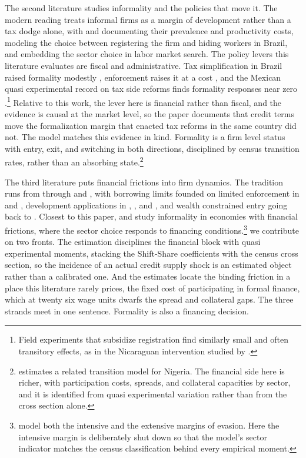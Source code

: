 \documentclass[12pt]{article}
\begin{document}
The second literature studies informality and the policies that move it. The modern reading treats informal firms as a margin of development rather than a tax dodge alone, with \citet{la2014informality} and \citet{busso2012formal} documenting their prevalence and productivity costs, \citet{ulyssea2018firms} modeling the choice between registering the firm and hiding workers in Brazil, and \citet{meghir2015wages} embedding the sector choice in labor market search. The policy levers this literature evaluates are fiscal and administrative. Tax simplification in Brazil raised formality modestly \citep{rocha2018lower}, enforcement raises it at a cost \citep{almeida2012enforcement}, and the Mexican quasi experimental record on tax side reforms finds formality responses near zero \citep{campos2020effects,bobba2021labor}.\footnote{Field experiments that subsidize registration find similarly small and often transitory effects, as in the Nicaraguan intervention studied by \citet{sutter2017transitioning}.} Relative to this work, the lever here is financial rather than fiscal, and the evidence is causal at the market level, so the paper documents that credit terms move the formalization margin that enacted tax reforms in the same country did not. The model matches this evidence in kind. Formality is a firm level status with entry, exit, and switching in both directions, disciplined by census transition rates, rather than an absorbing state.\footnote{\citet{adom2025structural} estimates a related transition model for Nigeria. The financial side here is richer, with participation costs, spreads, and collateral capacities by sector, and it is identified from quasi experimental variation rather than from the cross section alone.}

The third literature puts financial frictions into firm dynamics. The tradition runs from \citet{hopenhayn1992entry} through \citet{cooley2001financial} and \citet{gomes2001financing}, with borrowing limits founded on limited enforcement in \citet{albuquerque2004optimal} and \citet{clementi2006theory}, development applications in \citet{arellano2012firm}, \citet{midrigan2014finance}, and \citet{moll2014productivity}, and wealth constrained entry going back to \citet{evans1989estimated}. Closest to this paper, \citet{d2012financial} and \citet{erosa2023public} study informality in economies with financial frictions, where the sector choice responds to financing conditions.\footnote{\citet{erosa2023public} model both the intensive and the extensive margins of evasion. Here the intensive margin is deliberately shut down so that the model's sector indicator matches the census classification behind every empirical moment.} we contribute on two fronts. The estimation disciplines the financial block with quasi experimental moments, stacking the Shift-Share coefficients with the census cross section, so the incidence of an actual credit supply shock is an estimated object rather than a calibrated one. And the estimates locate the binding friction in a place this literature rarely prices, the fixed cost of participating in formal finance, which at twenty six wage units dwarfs the spread and collateral gaps. The three strands meet in one sentence. Formality is also a financing decision.
\end{document}
